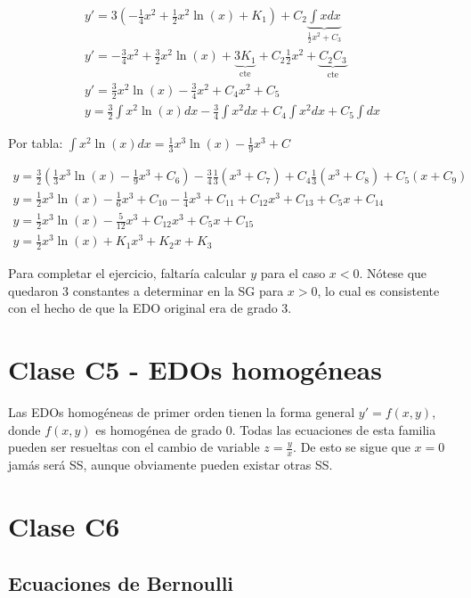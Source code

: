 \documentclass{article}
\begin{document}
\begin{gather}
y' = 3 \left( -\frac{1}{4} x^2 + \frac{1}{2} x^2 \ln (x) + K_1 \right) + C_2 \underbrace{\int x dx}_{\frac{1}{2} x^2 + C_3} \\
y' = -\frac{3}{4} x^2 + \frac{3}{2} x^2 \ln(x) + \underbrace{3 K_1}_{\text{cte}} + C_2 \frac{1}{2} x^2 + \underbrace{C_2 C_3}_{\text{cte}} \\
y' = \frac{3}{2} x^2 \ln(x) - \frac{3}{4} x^2 + C_4 x^2 + C_5 \\
y = \frac{3}{2} \int x^2 \ln(x) dx -\frac{3}{4} \int x^2 dx + C_4 \int x^2 dx + C_5 \int dx 
\end{gather}

Por tabla: $\int x^2 \ln(x) dx = \frac{1}{3} x^3 \ln(x) - \frac{1}{9} x^3 + C$

\begin{gather}
y = \frac{3}{2} \left( \frac{1}{3} x^3 \ln(x) - \frac{1}{9} x^3 + C_6 \right) -\frac{3}{4} \frac{1}{3} (x^3 + C_7) + C_4 \frac{1}{3} (x^3 + C_8) + C_5 (x + C_9) \\
y = \frac{1}{2} x^3 \ln(x) - \frac{1}{6} x^3 + C_{10} - \frac{1}{4} x^3 + C_{11} + C_{12} x^3 + C_{13} + C_5 x + C_{14} \\
y = \frac{1}{2} x^3 \ln(x) - \frac{5}{12} x^3 + C_{12} x^3 + C_5 x + C_{15} \\
y = \frac{1}{2} x^3 \ln(x) + K_1 x^3 + K_2 x + K_3
\end{gather}

Para completar el ejercicio, faltaría calcular $y$ para el caso $x<0$. Nótese que quedaron 3 constantes a determinar en la SG para $x >0$, lo cual es consistente con el hecho de que la EDO original era de grado 3.

\section{Clase C5 - EDOs homogéneas}

Las EDOs homogéneas de primer orden tienen la forma general $y' = f(x,y)$, donde $f(x,y)$ es homogénea de grado 0. Todas las ecuaciones de esta familia pueden ser resueltas con el cambio de variable $z = \frac{y}{x}$. De esto se sigue que $x = 0$ jamás será SS, aunque obviamente pueden existar otras SS.

\section{Clase C6}

\subsection{Ecuaciones de Bernoulli}
\end{document}
